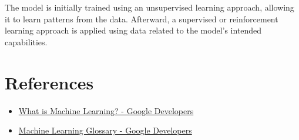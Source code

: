 \documentclass[a4paper,12pt]{article}
\begin{document}
The model is initially trained using an unsupervised learning approach, allowing it to learn patterns from the data. Afterward, a supervised or reinforcement learning approach is applied using data related to the model's intended capabilities.

\section*{References}
\begin{itemize}
    \item \href{https://developers.google.com/machine-learning/intro-to-ml/what-is-ml}{What is Machine Learning? - Google Developers}
    \item \href{https://developers.google.com/machine-learning/glossary}{Machine Learning Glossary - Google Developers}
\end{itemize}
\end{document}
